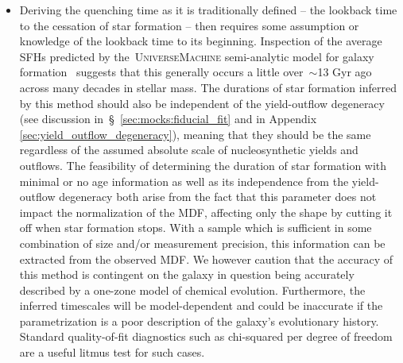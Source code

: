 \documentclass[ms.tex]{subfiles}
\begin{document}
\begin{itemize}
	\item Deriving the quenching time as it is traditionally defined -- the
	lookback time to the cessation of star formation -- then requires some
	assumption or knowledge of the lookback time to its beginning.
	Inspection of the average SFHs predicted by the~\textsc{UniverseMachine}
	semi-analytic model for galaxy formation~\citep{Behroozi2019} suggests that
	this generally occurs a little over~$\sim$13 Gyr ago across many decades in
	stellar mass.
	The durations of star formation inferred by this method should also
	be independent of the yield-outflow degeneracy (see discussion
	in~\S~\ref{sec:mocks:fiducial_fit} and in Appendix
	\ref{sec:yield_outflow_degeneracy}), meaning that they should be the same
	regardless of the assumed absolute scale of nucleosynthetic yields and
	outflows.
	The feasibility of determining the duration of star formation with minimal
	or no age information as well as its independence from the yield-outflow
	degeneracy both arise from the fact that this parameter does not impact the
	normalization of the MDF, affecting only the shape by cutting it off when
	star formation stops.
	With a sample which is sufficient in some combination of size and/or
	measurement precision, this information can be extracted from the observed
	MDF.
	We however caution that the accuracy of this method is contingent on
	the galaxy in question being accurately described by a one-zone model of
	chemical evolution.
	Furthermore, the inferred timescales will be model-dependent and could be
	inaccurate if the parametrization is a poor description of the galaxy's
	evolutionary history.
	Standard quality-of-fit diagnostics such as chi-squared per degree of
	freedom are a useful litmus test for such cases.

\end{itemize}
\end{document}
